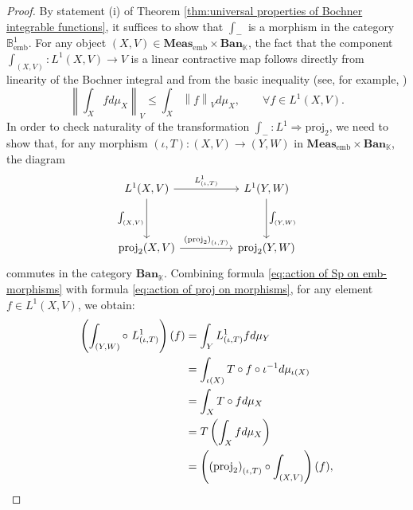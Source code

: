 \documentclass{amsart}
\theoremstyle{definition}
\theoremstyle{plain}
\newcommand{\norm}[1]{\left\lVert #1\right\rVert} %
\newcommand{\embMeas}{\mathbf{Meas}_\mathrm{emb}}
\newcommand{\Ban}{\mathbf{Ban}_{\mathbb{K}}}
\newcommand{\proj}{\mathrm{proj}_{2}}
\newcommand{\Bemb}{\mathbb{B}_{\mathrm{emb}}^1}
\begin{document}
        \begin{proof}
            By statement (i) of Theorem \ref{thm:universal properties of Bochner integrable functions}, it suffices to show that $\int_{-}$ is a morphism in the category $\Bemb$.
            For any object $(X,V) \in \embMeas \times \Ban$, the fact that the component $\int_{(X,V)} \colon L^1(X,V) \rightarrow V$ is a linear contractive map follows directly from linearity of the Bochner integral and from the basic inequality (see, for example, \cite[Theorem II.2.4]{Diestel/Uhl1977}) 
            \begin{equation*}
                \norm{\int_X f d\mu_X}_V \leq \int_X \norm{f}_V d\mu_X, \qquad \forall f \in L^1(X,V).
            \end{equation*}
            In order to check naturality of the transformation $\int_{-} \colon L^1 \Rightarrow \proj$, we need to show that, for any morphism $(\iota,T) \colon (X,V) \rightarrow (Y,W)$ in $\embMeas \times \Ban$, the diagram
            \begin{equation*}
                \begin{tikzcd}
                    L^1(X,V) \ar[rr, "L^1_{(\iota,T)}"] \ar[dd, "\int_{(X,V)}"']  &   & L^1(Y,W) \ar[dd, "\int_{(Y,W)}"] \\
                        &   & \\
                    \proj(X,V) \ar[rr, "\left( \proj \right)_{(\iota,T)}"]   &   & \proj(Y,W)
                \end{tikzcd}
            \end{equation*}
            commutes in the category $\Ban$.
            Combining formula \eqref{eq:action of Sp on emb-morphisms} with formula \eqref{eq:action of proj on morphisms}, for any element $f \in L^1(X,V)$, we obtain: 
            \begin{align}
                \left( \int_{(Y,W)} \circ ~ L^1_{(\iota,T)} \right) (f) &= \int_Y L^1_{(\iota,T)} f d\mu_Y \notag \\
                &= \int_{\iota(X)} T \circ f \circ \iota^{-1} d\mu_{\iota(X)} \label{eq:use definition of L1_iotaT} \\
                &= \int_X T \circ f d\mu_X \label{eq:use that iota is measure-preserving} \\
                &= T \left( \int_X f d\mu_X \right) \label{eq:use properties of the Bochner integral} \\
                &= \left( \left( \proj \right)_{(\iota,T)} \circ \int_{(X,V)} \right) (f), \notag
            \end{align}

\end{proof}
\end{document}

